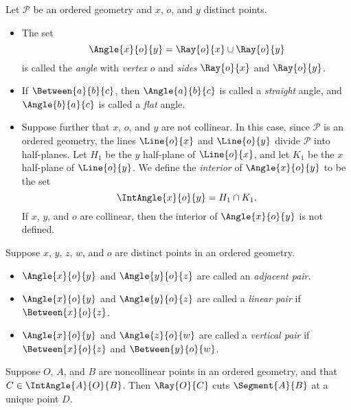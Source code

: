 \documentclass{article}
\begin{document}

\begin{dfn}[Angle]
Let $\mathcal{P}$ be an ordered geometry and $x$, $o$, and $y$ distinct points.
\begin{itemize}
\item The set \[ \Angle{x}{o}{y} = \Ray{o}{x} \cup \Ray{o}{y} \] is called the \emph{angle} with \emph{vertex} $o$ and \emph{sides} $\Ray{o}{x}$ and $\Ray{o}{y}$.
\item If $\Between{a}{b}{c}$, then $\Angle{a}{b}{c}$ is called a \emph{straight} angle, and $\Angle{b}{a}{c}$ is called a \emph{flat} angle.
\item Suppose further that $x$, $o$, and $y$ are not collinear. In this case, since $\mathcal{P}$ is an ordered geometry, the lines $\Line{o}{x}$ and $\Line{o}{y}$ divide $\mathcal{P}$ into half-planes. Let $H_1$ be the $y$ half-plane of $\Line{o}{x}$, and let $K_1$ be the $x$ half-plane of $\Line{o}{y}$. We define the \emph{interior} of $\Angle{x}{o}{y}$ to be the set \[ \IntAngle{x}{o}{y} = H_1 \cap K_1. \] If $x$, $y$, and $o$ are collinear, then the interior of $\Angle{x}{o}{y}$ is not defined.
\end{itemize}
\end{dfn}

\begin{dfn}
Suppose $x$, $y$, $z$, $w$, and $o$ are distinct points in an ordered geometry.
\begin{itemize}
\item $\Angle{x}{o}{y}$ and $\Angle{y}{o}{z}$ are called an \emph{adjacent pair}.
\item $\Angle{x}{o}{y}$ and $\Angle{y}{o}{z}$ are called a \emph{linear pair} if $\Between{x}{o}{z}$.
\item $\Angle{x}{o}{y}$ and $\Angle{z}{o}{w}$ are called a \emph{vertical pair} if $\Between{x}{o}{z}$ and $\Between{y}{o}{w}$.
\end{itemize}
\end{dfn}

\begin{thm}
Suppose $O$, $A$, and $B$ are noncollinear points in an ordered geometry, and that $C \in \IntAngle{A}{O}{B}$. Then $\Ray{O}{C}$ cuts $\Segment{A}{B}$ at a unique point $D$.
\end{thm}
\end{document}
